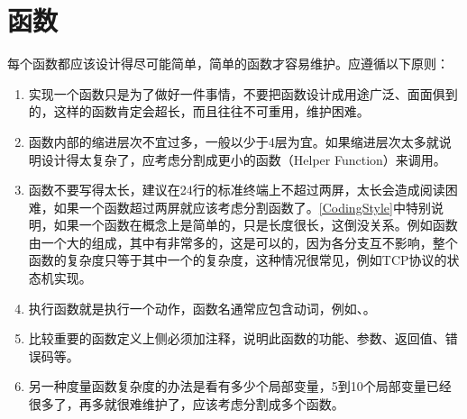 


\section{函数}
%
每个函数都应该设计得尽可能简单，简单的函数才容易维护。应遵循以下原则：


\begin{enumerate}

\item 实现一个函数只是为了做好一件事情，不要把函数设计成用途广泛、面面俱到的，这样的函数肯定会超长，而且往往不可重用，维护困难。

\item 函数内部的缩进层次不宜过多，一般以少于4层为宜。如果缩进层次太多就说明设计得太复杂了，应考虑分割成更小的函数（Helper Function）来调用。

\item 函数不要写得太长，建议在24行的标准终端上不超过两屏，太长会造成阅读困难，如果一个函数超过两屏就应该考虑分割函数了。\hyperlink{db.bi01.bibli.codingstyle}{[CodingStyle]}中特别说明，如果一个函数在概念上是简单的，只是长度很长，这倒没关系。例如函数由一个大的组成，其中有非常多的，这是可以的，因为各分支互不影响，整个函数的复杂度只等于其中一个的复杂度，这种情况很常见，例如TCP协议的状态机实现。

\item 执行函数就是执行一个动作，函数名通常应包含动词，例如、。

\item 比较重要的函数定义上侧必须加注释，说明此函数的功能、参数、返回值、错误码等。

\item 另一种度量函数复杂度的办法是看有多少个局部变量，5到10个局部变量已经很多了，再多就很难维护了，应该考虑分割成多个函数。
\end{enumerate}



